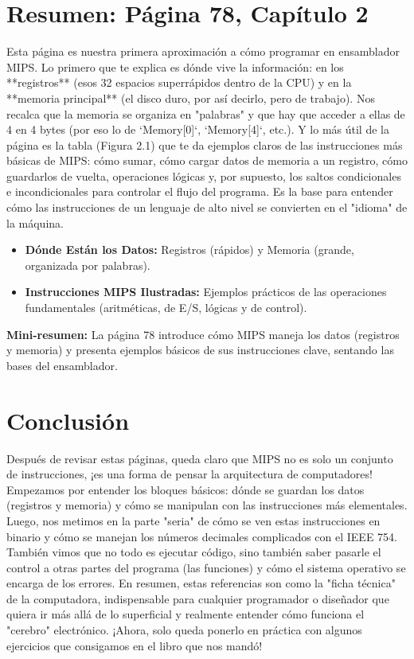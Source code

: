 \documentclass{article}
\begin{document}
\section*{Resumen: Página 78, Capítulo 2}
Esta página es nuestra primera aproximación a cómo programar en ensamblador MIPS. Lo primero que te explica es dónde vive la información: en los **registros** (esos 32 espacios superrápidos dentro de la CPU) y en la **memoria principal** (el disco duro, por así decirlo, pero de trabajo). Nos recalca que la memoria se organiza en "palabras" y que hay que acceder a ellas de 4 en 4 bytes (por eso lo de `Memory[0]`, `Memory[4]`, etc.). Y lo más útil de la página es la tabla (Figura 2.1) que te da ejemplos claros de las instrucciones más básicas de MIPS: cómo sumar, cómo cargar datos de memoria a un registro, cómo guardarlos de vuelta, operaciones lógicas y, por supuesto, los saltos condicionales e incondicionales para controlar el flujo del programa. Es la base para entender cómo las instrucciones de un lenguaje de alto nivel se convierten en el "idioma" de la máquina.

\begin{itemize}
    \item \textbf{Dónde Están los Datos:} Registros (rápidos) y Memoria (grande, organizada por palabras).
    \item \textbf{Instrucciones MIPS Ilustradas:} Ejemplos prácticos de las operaciones fundamentales (aritméticas, de E/S, lógicas y de control).
\end{itemize}
\textbf{Mini-resumen:} La página 78 introduce cómo MIPS maneja los datos (registros y memoria) y presenta ejemplos básicos de sus instrucciones clave, sentando las bases del ensamblador.

\section*{Conclusión}
Después de revisar estas páginas, queda claro que MIPS no es solo un conjunto de instrucciones, ¡es una forma de pensar la arquitectura de computadores! Empezamos por entender los bloques básicos: dónde se guardan los datos (registros y memoria) y cómo se manipulan con las instrucciones más elementales. Luego, nos metimos en la parte "seria" de cómo se ven estas instrucciones en binario y cómo se manejan los números decimales complicados con el IEEE 754. También vimos que no todo es ejecutar código, sino también saber pasarle el control a otras partes del programa (las funciones) y cómo el sistema operativo se encarga de los errores. En resumen, estas referencias son como la "ficha técnica" de la computadora, indispensable para cualquier programador o diseñador que quiera ir más allá de lo superficial y realmente entender cómo funciona el "cerebro" electrónico. ¡Ahora, solo queda ponerlo en práctica con algunos ejercicios que consigamos en el libro que nos mandó!
\end{document}
